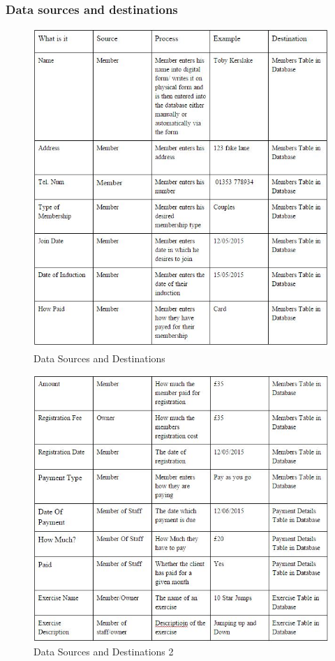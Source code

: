 \subsubsection{Data sources and destinations}

\begin{figure}[H]
    \includegraphics[width=\textwidth]{Data Sources and Definitions - Proposed 2.JPG}
    \caption{Data Sources and Destinations} \label{fig: Data Sources and Destinations }
\end{figure}

\begin{figure}[H]
    \includegraphics[width=\textwidth]{Data Sources and Definitions - Proposed.JPG}
    \caption{Data Sources and Destinations 2} \label{fig: Data Sources and Destinations 2 }
\end{figure}

